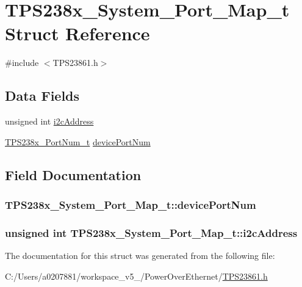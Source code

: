 \hypertarget{struct_t_p_s238x___system___port___map__t}{\section{T\-P\-S238x\-\_\-\-System\-\_\-\-Port\-\_\-\-Map\-\_\-t Struct Reference}
\label{struct_t_p_s238x___system___port___map__t}
}


{\ttfamily \#include $<$T\-P\-S23861.\-h$>$}

\subsection*{Data Fields}
\begin{DoxyCompactItemize}
\item 
unsigned int \hyperlink{struct_t_p_s238x___system___port___map__t_ac560568f62ef409bf05e6617d6a0a1a7}{i2c\-Address}
\item 
\hyperlink{_t_p_s23861_8h_aa39b69aefe1747a2913f52404265f49d}{T\-P\-S238x\-\_\-\-Port\-Num\-\_\-t} \hyperlink{struct_t_p_s238x___system___port___map__t_ad40a24e27933440cbf2c173eaa3f9beb}{device\-Port\-Num}
\end{DoxyCompactItemize}


\subsection{Field Documentation}
\hypertarget{struct_t_p_s238x___system___port___map__t_ad40a24e27933440cbf2c173eaa3f9beb}{
\subsubsection[{device\-Port\-Num}]{ T\-P\-S238x\-\_\-\-System\-\_\-\-Port\-\_\-\-Map\-\_\-t\-::device\-Port\-Num}}\label{struct_t_p_s238x___system___port___map__t_ad40a24e27933440cbf2c173eaa3f9beb}
\hypertarget{struct_t_p_s238x___system___port___map__t_ac560568f62ef409bf05e6617d6a0a1a7}{
\subsubsection[{i2c\-Address}]{\setlength{\rightskip}{0pt plus 5cm}unsigned int T\-P\-S238x\-\_\-\-System\-\_\-\-Port\-\_\-\-Map\-\_\-t\-::i2c\-Address}}\label{struct_t_p_s238x___system___port___map__t_ac560568f62ef409bf05e6617d6a0a1a7}


The documentation for this struct was generated from the following file\-:\begin{DoxyCompactItemize}
\item 
C\-:/\-Users/a0207881/workspace\-\_\-v5\-\_/\-Power\-Over\-Ethernet/\hyperlink{_t_p_s23861_8h}{T\-P\-S23861.\-h}\end{DoxyCompactItemize}
